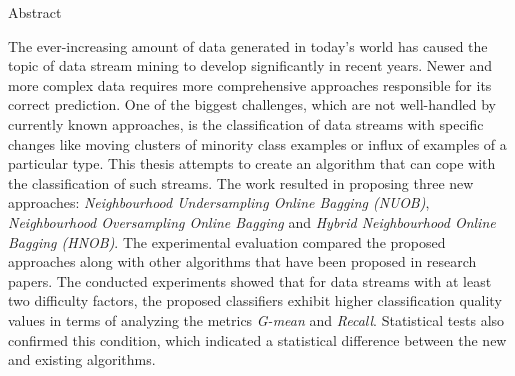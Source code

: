 \documentclass[polish,master,a4paper,oneside,11pt]{ppfcmthesis}
\begin{document}
\begin{center}
    \huge Abstract
\end{center}
The ever-increasing amount of data generated in today's world has caused the topic of data stream mining to develop significantly in recent years. Newer and more complex data requires more comprehensive approaches responsible for its correct prediction. One of the biggest challenges, which are not well-handled by currently known approaches, is the classification of data streams with specific changes like moving clusters of minority class examples or influx of examples of a particular type. This thesis attempts to create an algorithm that can cope with the classification of such streams. The work resulted in proposing three new approaches: \textit{Neighbourhood Undersampling Online Bagging (NUOB)}, \textit{Neighbourhood Oversampling Online Bagging} and \textit{Hybrid Neighbourhood Online Bagging (HNOB)}. The experimental evaluation compared the proposed approaches along with other algorithms that have been proposed in research papers. The conducted experiments showed that for data streams with at least two difficulty factors, the proposed classifiers exhibit higher classification quality values in terms of analyzing the metrics \textit{G-mean} and \textit{Recall}. Statistical tests also confirmed this condition, which indicated a statistical difference between the new and existing algorithms.


\newpage\null\thispagestyle{empty}\newpage
\newpage
{}\pagestyle{ppfcmthesis}%
\tableofcontents* 
\cleardoublepage %


\mainmatter%









{\raggedright\sloppy\small}


\newpage\null\thispagestyle{empty}\newpage
\cleardoublepage\appendix%
\newpage



\newpage\null\thispagestyle{empty}\newpage

\ppcolophon
\end{document}
